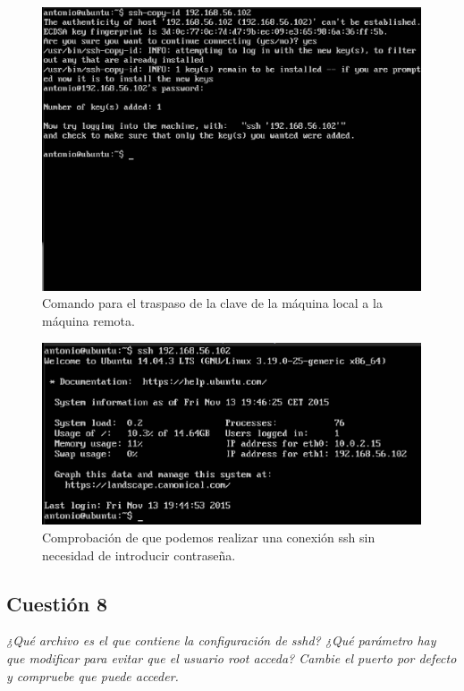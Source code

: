 \begin{figure}[H]
    \begin{center}
        \includegraphics[scale=0.45]{imagenes/img3.eps}
        \caption{Comando para el traspaso de la clave de la máquina local a la máquina remota.}
        \label{fig3}
    \end{center}
\end{figure}

\begin{figure}[H]
    \begin{center}
        \includegraphics[scale=0.5]{imagenes/img4.eps}
        \caption{Comprobación de que podemos realizar una conexión ssh sin necesidad de introducir contraseña.}
        \label{fig4}
    \end{center}
\end{figure}

\subsection{Cuestión 8}
\textit{¿Qué archivo es el que contiene la configuración de sshd? ¿Qué parámetro hay que modificar para evitar que el usuario root acceda? Cambie el puerto por defecto y compruebe que puede acceder.}
\newline

